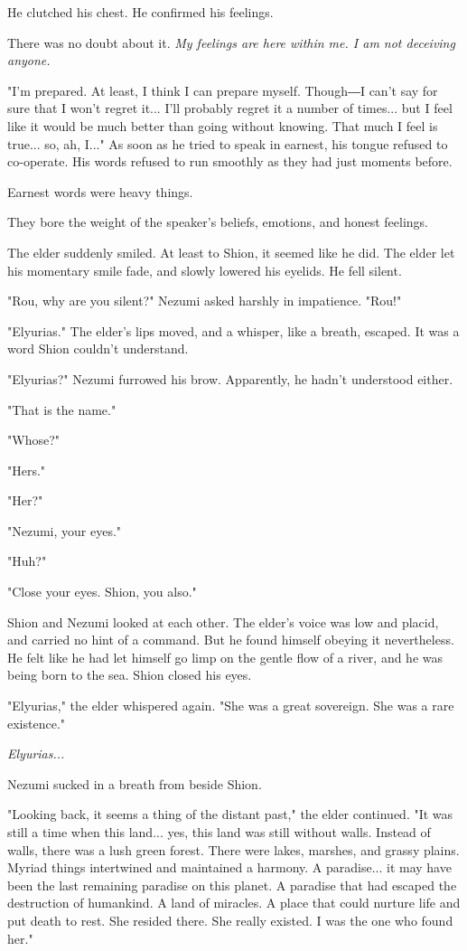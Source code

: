 He clutched his chest. He confirmed his feelings.

There was no doubt about it. \emph{My feelings are here within me. I am not
	deceiving anyone.}

"I'm prepared. At least, I think I can prepare myself. Though―I can't
say for sure that I won't regret it... I'll probably regret it a number
of times... but I feel like it would be much better than going without
knowing. That much I feel is true... so, ah, I..." As soon as he tried
to speak in earnest, his tongue refused to co-operate. His words refused
to run smoothly as they had just moments before.

Earnest words were heavy things.

They bore the weight of the speaker's beliefs, emotions, and honest
feelings.

The elder suddenly smiled. At least to Shion, it seemed like he did. The
elder let his momentary smile fade, and slowly lowered his eyelids. He
fell silent.

"Rou, why are you silent?" Nezumi asked harshly in impatience. "Rou!"

"Elyurias." The elder's lips moved, and a whisper, like a breath,
escaped. It was a word Shion couldn't understand.

"Elyurias?" Nezumi furrowed his brow. Apparently, he hadn't understood
either.

"That is the name."

"Whose?"

"Hers."

"Her?"

"Nezumi, your eyes."

"Huh?"

"Close your eyes. Shion, you also."

Shion and Nezumi looked at each other. The elder's voice was low and
placid, and carried no hint of a command. But he found himself obeying
it nevertheless. He felt like he had let himself go limp on the gentle
flow of a river, and he was being born to the sea. Shion closed his
eyes.

"Elyurias," the elder whispered again. "She was a great sovereign. She
was a rare existence."

\emph{Elyurias...}

Nezumi sucked in a breath from beside Shion.

"Looking back, it seems a thing of the distant past," the elder
continued. "It was still a time when this land... yes, this land was
still without walls. Instead of walls, there was a lush green forest.
There were lakes, marshes, and grassy plains. Myriad things intertwined
and maintained a harmony. A paradise... it may have been the last
remaining paradise on this planet. A paradise that had escaped the
destruction of humankind. A land of miracles. A place that could nurture
life and put death to rest. She resided there. She really existed. I was
the one who found her."

